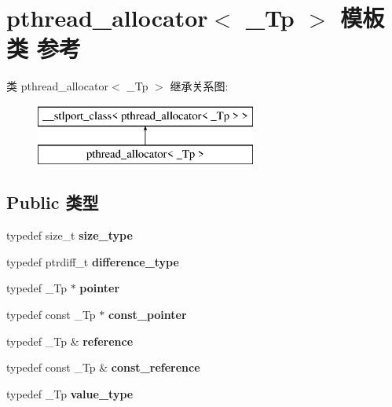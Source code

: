 \hypertarget{classpthread__allocator}{}\section{pthread\+\_\+allocator$<$ \+\_\+\+Tp $>$ 模板类 参考}
\label{classpthread__allocator}
类 pthread\+\_\+allocator$<$ \+\_\+\+Tp $>$ 继承关系图\+:\begin{figure}[H]
\begin{center}
\leavevmode
\includegraphics[height=2.000000cm]{classpthread__allocator}
\end{center}
\end{figure}
\subsection*{Public 类型}
\begin{DoxyCompactItemize}
\item 
\mbox{\label{classpthread__allocator_ae2bd0e4e8f54fd2d19bd8846e1ba3e0d}} 
typedef size\+\_\+t {\bfseries size\+\_\+type}
\item 
\mbox{\label{classpthread__allocator_ade982785cd60c704345c244fc86e5ecc}} 
typedef ptrdiff\+\_\+t {\bfseries difference\+\_\+type}
\item 
\mbox{\label{classpthread__allocator_afca03e409c618c1b3fb0ad08de77b011}} 
typedef \+\_\+\+Tp $\ast$ {\bfseries pointer}
\item 
\mbox{\label{classpthread__allocator_a03b730d0196244b07c7c7ec5f356b664}} 
typedef const \+\_\+\+Tp $\ast$ {\bfseries const\+\_\+pointer}
\item 
\mbox{\label{classpthread__allocator_ae0fae1b2d4d5d70b7f3bf5b970372c81}} 
typedef \+\_\+\+Tp \& {\bfseries reference}
\item 
\mbox{\label{classpthread__allocator_a58e80cd31c2436c99f41e9763930860c}} 
typedef const \+\_\+\+Tp \& {\bfseries const\+\_\+reference}
\item 
\mbox{\label{classpthread__allocator_a99eb5d4a72db4817d1917bcfa7dad129}} 
typedef \+\_\+\+Tp {\bfseries value\+\_\+type}
\end{DoxyCompactItemize}
